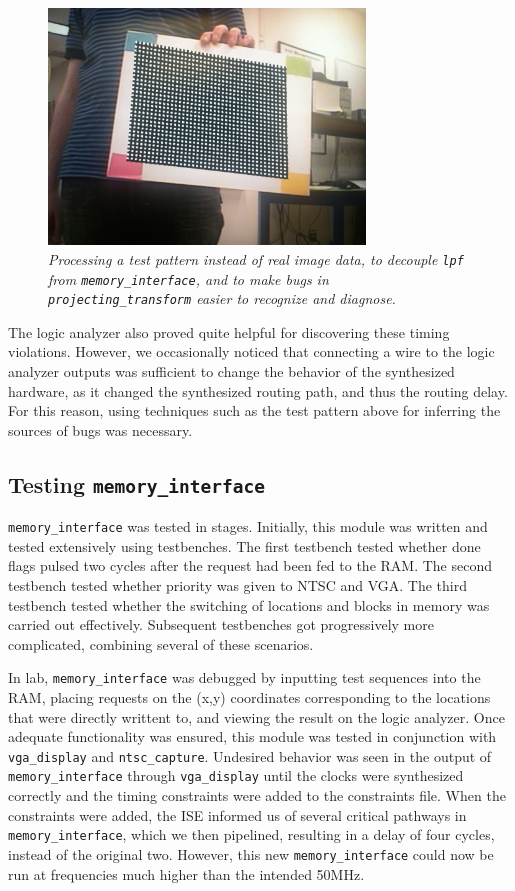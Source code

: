 \documentclass[10pt]{article}
\begin{document}
\begin{figure}[h!]
\centering
\includegraphics[width=0.75\textwidth]{images/IMG_0121.JPG}
\caption{\emph{Processing a test pattern instead of real image data, to decouple {\tt lpf} from {\tt memory\_interface}, and to make bugs in {\tt projecting\_transform} easier to recognize and diagnose.}}
\end{figure}

The logic analyzer also proved quite helpful for discovering these timing violations. However, we occasionally noticed that connecting a wire to the logic analyzer outputs was sufficient to change the behavior of the synthesized hardware, as it changed the synthesized routing path, and thus the routing delay. For this reason, using techniques such as the test pattern above for inferring the sources of bugs was necessary.

\subsection{Testing {\tt memory\_interface}}
{\tt memory\_interface} was tested in stages. Initially, this module was written and tested extensively using testbenches. The first testbench tested whether done flags pulsed two cycles after the request had been fed to the RAM. The second testbench tested whether priority was given to NTSC and VGA. The third testbench tested whether the switching of locations and blocks in memory was carried out effectively. Subsequent testbenches got progressively more complicated, combining several of these scenarios.

In lab, {\tt memory\_interface} was debugged by inputting test sequences into the RAM, placing requests on the (x,y) coordinates corresponding to the locations that were directly writtent to, and viewing the result on the logic analyzer. Once adequate functionality was ensured, this module was tested in conjunction with {\tt vga\_display} and {\tt ntsc\_capture}. Undesired behavior was seen in the output of {\tt memory\_interface} through {\tt vga\_display} until the clocks were synthesized correctly and the timing constraints were added to the constraints file. When the constraints were added, the ISE informed us of several critical pathways in {\tt memory\_interface}, which we then pipelined, resulting in a delay of four cycles, instead of the original two. However, this new {\tt memory\_interface} could now be run at frequencies much higher than the intended 50MHz.
\end{document}
